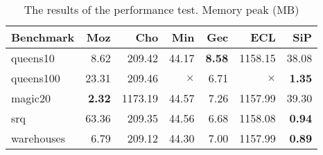 \begin{table}
\caption{\label{results:performance:memory}The results of the performance test. Memory peak (MB)}
\begin{center}
\begin{tabular}{lrrrrrr}
\hline Benchmark & Moz & Cho & Min & Gec & ECL & SiP \\
\hline 	queens10 & 8.62 & 209.42 & 44.17 & {\bf 8.58} & 1158.15 & 38.08 \\
				queens100 & 23.31 & 209.46 & $\times$ & 6.71 & $\times$ & {\bf 1.35} \\
				magic20 & {\bf 2.32} & 1173.19 & 44.57 & 7.26 & 1157.99 & 39.30 \\
				srq & 63.36 & 209.35 & 44.56 & 6.68 & 1158.08 & {\bf 0.94} \\
				warehouses & 6.79  & 209.12 & 44.30 & 7.00 & 1157.99 & {\bf 0.89} \\
\hline
\end{tabular}
\end{center}
\end{table}

